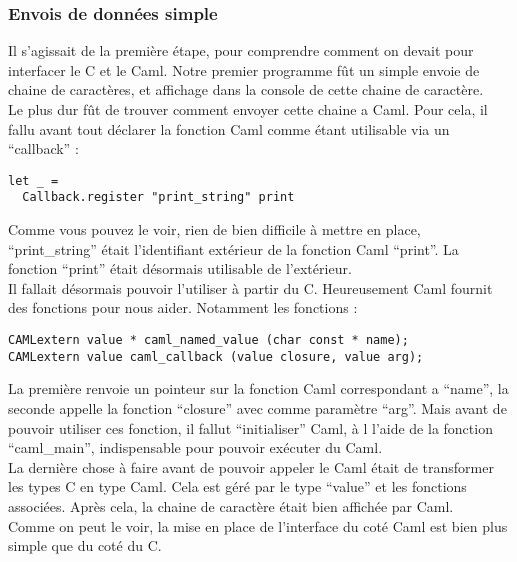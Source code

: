 \documentclass[a4paper,12pt]{article}
\begin{document}
		\subsubsection{Envois de données simple}
Il s'agissait de  la première étape,  pour comprendre  comment on devait
pour interfacer le C et le  Caml.  Notre premier programme fût un simple
envoie de chaine  de caractères,  et affichage dans la  console de cette
chaine de caractère.\\
Le plus  dur fût de trouver  comment envoyer cette  chaine a Caml.  Pour
cela,  il  fallu  avant  tout  déclarer  la  fonction  Caml  comme étant
utilisable via un ``callback'' :
\begin{verbatim}
let _ =
  Callback.register "print_string" print
\end{verbatim}
Comme vous  pouvez le voir,  rien de  bien difficile à  mettre en place,
``print\_string''  était l'identifiant  extérieur  de  la  fonction Caml
``print''.   La  fonction   ``print''  était  désormais   utilisable  de
l'extérieur.\\
Il  fallait désormais  pouvoir l'utiliser  à partir  du C.  Heureusement
Caml fournit des fonctions pour nous aider.  Notamment les fonctions :
\begin{verbatim}
CAMLextern value * caml_named_value (char const * name);
CAMLextern value caml_callback (value closure, value arg);
\end{verbatim}
La première  renvoie un  pointeur sur la  fonction Caml  correspondant a
``name'',   la  seconde  appelle  la  fonction  ``closure''  avec  comme
paramètre ``arg''.  Mais  avant  de  pouvoir  utiliser ces fonction,  il
fallut ``initialiser'' Caml,  à l  l'aide de la fonction ``caml\_main'',
indispensable pour pouvoir exécuter du Caml.\\
La dernière  chose à  faire avant de  pouvoir appeler  le Caml  était de
transformer  les types  C en  type  Caml.  Cela  est  géré  par  le type
``value''  et  les  fonctions  associées.   Après  cela,  la  chaine  de
caractère était bien affichée par Caml.\\
Comme on peut le voir,  la mise en place de l'interface du coté Caml est
bien plus simple que du coté du C.\\
\end{document}
